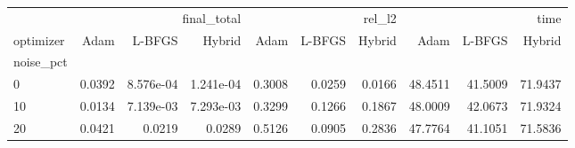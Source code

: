 \begin{tabular}{lrrrrrrrrr}
\toprule
 & \multicolumn{3}{r}{final_total} & \multicolumn{3}{r}{rel_l2} & \multicolumn{3}{r}{time} \\
optimizer & Adam & L-BFGS & Hybrid & Adam & L-BFGS & Hybrid & Adam & L-BFGS & Hybrid \\
noise_pct &  &  &  &  &  &  &  &  &  \\
\midrule
0 & 0.0392 & 8.576e-04 & 1.241e-04 & 0.3008 & 0.0259 & 0.0166 & 48.4511 & 41.5009 & 71.9437 \\
10 & 0.0134 & 7.139e-03 & 7.293e-03 & 0.3299 & 0.1266 & 0.1867 & 48.0009 & 42.0673 & 71.9324 \\
20 & 0.0421 & 0.0219 & 0.0289 & 0.5126 & 0.0905 & 0.2836 & 47.7764 & 41.1051 & 71.5836 \\
\bottomrule
\end{tabular}
